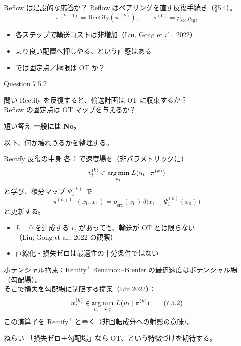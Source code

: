 \asmain
\begin{frame}{Reflow は建設的な応答か？}
    Reflow はペアリングを直す反復手続き（§5.4）。
    \[
        \pi^{(k+1)}=\mathrm{Rectify}(\pi^{(k)}),\qquad
        \pi^{(0)}=p_{\mathrm{src}}\,p_{\mathrm{tgt}}
    \]
    \begin{itemize}
        \item 各ステップで輸送コストは非増加（Liu, Gong et al., 2022）
        \item より良い配置へ押しやる、という直感はある
        \item では固定点／極限は OT か？
    \end{itemize}
\end{frame}
\asmain
\begin{frame}{Question 7.5.2}
    \begin{block}{問い}
        Rectify を反復すると、輸送計画は OT に収束するか？\\
        Reflow の固定点は OT マップを与えるか？
    \end{block}
    \begin{alertblock}{短い答え}
        \textbf{一般には No。}
    \end{alertblock}
    以下、何が壊れうるかを整理する。
\end{frame}
\asmain
\begin{frame}{Rectify 反復の中身}
    各 $k$ で速度場を（非パラメトリックに）
    \[
        v_t^{(k)}\in\operatorname*{arg\,min}_{u_t}\,L(u_t\mid\pi^{(k)})
    \]
    と学び、積分マップ $\Psi_1^{(k)}$ で
    \[
        \pi^{(k+1)}(x_0,x_1)
        =
        p_{\mathrm{src}}(x_0)\,
        \delta\!\bigl(x_1-\Psi_1^{(k)}(x_0)\bigr)
    \]
    と更新する。
    \begin{itemize}
        \item $L=0$ を達成する $v_t$ があっても、輸送が OT とは限らない\\
        （Liu, Gong et al., 2022 の観察）
        \item 直線化・損失ゼロは最適性の十分条件ではない
    \end{itemize}
\end{frame}
\asmain
\begin{frame}{ポテンシャル拘束：$\mathrm{Rectify}^\perp$}
    Benamou--Brenier の最適速度はポテンシャル場（勾配場）。\\
    そこで損失を勾配場に制限する提案（Liu 2022）：
    \[
        w_t^{(k)}\in
        \operatorname*{arg\,min}_{u_t=\nabla\phi}\,L(u_t\mid\pi^{(k)})
        \tag{7.5.2}
    \]
    この演算子を $\mathrm{Rectify}^\perp$ と書く（非回転成分への射影の意味）。
    \begin{exampleblock}{ねらい}
        「損失ゼロ＋勾配場」なら OT、という特徴づけを期待する。
    \end{exampleblock}
\end{frame}
